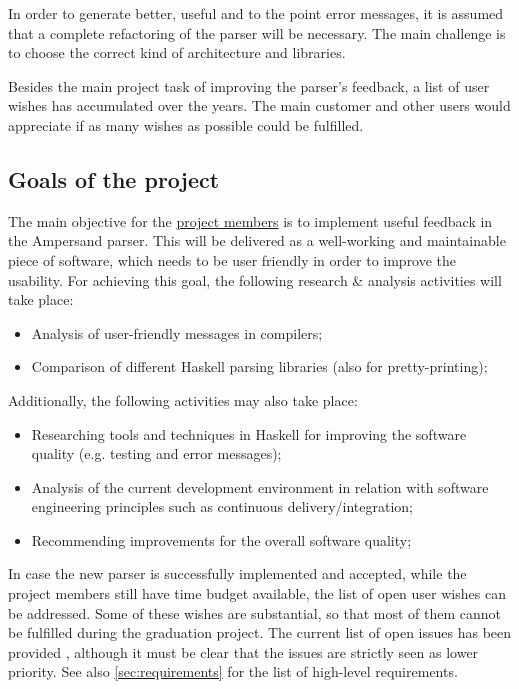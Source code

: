 In order to generate better, useful and to the point error messages, it is assumed that a complete refactoring of the parser will be necessary.
The main challenge is to choose the correct kind of architecture and libraries.

Besides the main project task of improving the parser's feedback, a list of user wishes has accumulated over the years.
The main customer and other users would appreciate if as many wishes as possible could be fulfilled.

\subsection{Goals of the project}
\label{subsec:project-goals}
The main objective for the \underline{project members} is to implement useful feedback in the Ampersand parser.
This will be delivered as  a well-working and maintainable piece of software, which needs to be user friendly in order to improve the usability.
For achieving this goal, the following research \& analysis activities will take place:
\begin{itemize}
	\item Analysis of user-friendly messages in compilers;
	\item Comparison of different Haskell parsing libraries (also for pretty-printing);
\end{itemize}
%
Additionally, the following activities may also take place:
\begin{itemize}
	\item Researching tools and techniques in Haskell for improving the software quality (e.g. testing and error messages);
	\item Analysis of the current development environment in relation with software engineering principles such as continuous delivery/integration;
	\item Recommending improvements for the overall software quality;
\end{itemize}
%
In case the new parser is successfully implemented and accepted, while the project members still have time budget available, the list of open user wishes can be addressed.
Some of these wishes are substantial, so that most of them cannot be fulfilled during the graduation project.
The current list of open issues has been provided \cite{open-issues}, although it must be clear that the issues are strictly seen as lower priority.
See also \autoref{sec:requirements} for the list of high-level requirements.

